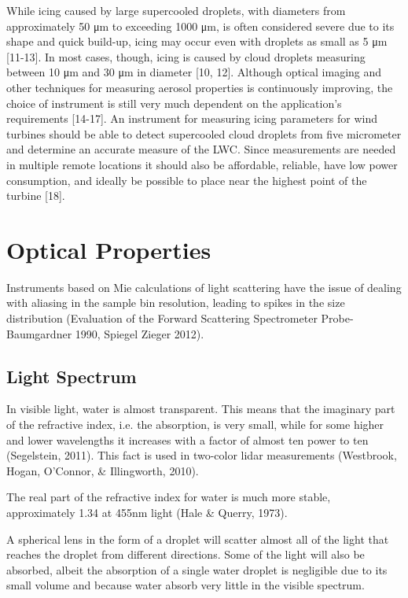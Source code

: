 While icing caused by large supercooled droplets, with diameters from approximately 50 μm to exceeding 1000 μm, is often considered severe due to its shape and quick build-up, icing may occur even with droplets as small as 5 μm [11-13]. In most cases, though, icing is caused by cloud droplets measuring between 10 μm and 30 μm in diameter [10, 12].
Although optical imaging and other techniques for measuring aerosol properties is continuously improving, the choice of instrument is still very much dependent on the application’s requirements [14-17]. An instrument for measuring icing parameters for wind turbines should be able to detect supercooled cloud droplets from five micrometer and determine an accurate measure of the LWC. Since measurements are needed in multiple remote locations it should also be affordable, reliable, have low power consumption, and ideally be possible to place near the highest point of the turbine [18].


\section{Optical Properties}
Instruments based on Mie calculations of light scattering have the issue of dealing with aliasing in the sample bin resolution, leading to spikes in the size distribution (Evaluation of the Forward Scattering Spectrometer Probe-Baumgardner 1990, Spiegel Zieger 2012). 

\subsection{Light Spectrum}
 In visible light, water is almost transparent. This means that the imaginary part of the refractive index, i.e. the absorption, is very small, while for some higher and lower wavelengths it increases with a factor of almost ten power to ten (Segelstein, 2011). This fact is used in two-color lidar measurements (Westbrook, Hogan, O'Connor, \& Illingworth, 2010).

The real part of the refractive index for water is much more stable, approximately 1.34 at 455nm light (Hale \& Querry, 1973).

A spherical lens in the form of a droplet will scatter almost all of the light that reaches the droplet from different directions. Some of the light will also be absorbed, albeit the absorption of a single water droplet is negligible due to its small volume and because water absorb very little in the visible spectrum.


